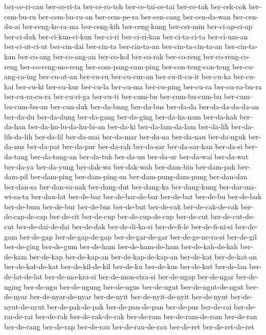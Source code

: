 {ber-ce-ri-cau ber-ce-ri-ta ber-ce-ro-teh ber-ce-tai-ce-tai ber-ce-tak
ber-cek-cok ber-cem-bu-ru ber-cem-bu-ru-an ber-cem-pe-ra ber-cen-cang
ber-cen-da-wan ber-cen-du-ai ber-ceng-ke-ra-ma ber-ceng-kih ber-ceng-kung
ber-cer-min ber-ci-ap-ci-ap ber-ci-duk ber-ci-kun-ci-kun ber-ci-ri
ber-ci-ri-kan ber-ci-ta-ci-ta ber-ci-um-an ber-ci-ut-ci-ut ber-cin-dai
ber-cin-ta ber-cin-ta-an ber-cin-ta-cin-ta-an ber-cin-ta-kan ber-co-ang
ber-co-ang-an ber-co-kol ber-co-rak ber-co-reng ber-co-reng-co-reng
ber-co-reng-mo-reng ber-com-pang-cam-ping ber-con-teng-con-teng
ber-cu-ang-ca-ing ber-cu-at-an ber-cu-cu ber-cu-cur-an ber-cu-it-cu-it
ber-cu-ka ber-cu-kai ber-cu-ki ber-cu-kur ber-cu-la ber-cu-ma ber-cu-ping
ber-cu-ra ber-cu-ra-bu-ra ber-cu-ra-cu-ra ber-cu-ri-ga ber-cu-ti
ber-cum-bu ber-cum-bu-cum-bu ber-cum-bu-cum-bu-an ber-cun-duk ber-da-bung
ber-da-bus ber-da-da ber-da-da-da-da-an ber-da-du ber-da-dung ber-da-gang
ber-da-ging ber-da-ha-nam ber-da-hak ber-da-han ber-da-hu-lu-da-hu-lu-an
ber-da-ki ber-da-lam-da-lam ber-da-lih ber-da-lih-da-lih ber-da-lil
ber-da-mai ber-da-mar ber-da-na ber-da-nau ber-da-nguk ber-da-nus
ber-da-pat ber-da-pur ber-da-rah ber-da-sar ber-da-sar-kan ber-da-si
ber-da-tang ber-da-tang-an ber-da-tuk ber-da-un ber-da-ur ber-da-wai
ber-da-wat ber-da-ya ber-da-yung ber-dak-wa ber-dak-wah ber-dam-bin
ber-dam-pak ber-dam-pil ber-dam-ping ber-dam-ping-an ber-dam-pung-dam-pung
ber-dan-dan ber-dan-sa ber-dan-sa-nak ber-dang-dut ber-dang-ka
ber-dang-kung ber-dar-ma-wi-sa-ta ber-dau-lat ber-de-bar ber-de-bar-de-bar
ber-de-bat ber-de-bu ber-de-buk ber-de-bum ber-de-bur ber-de-bus
ber-de-but ber-de-cak ber-de-cak-de-cak ber-de-cap-de-cap ber-de-cit
ber-de-cup ber-de-cup-de-cup ber-de-cut ber-de-cut-de-cut
ber-de-dai-de-dai ber-de-dak ber-de-di-ka-si ber-de-fi-le ber-de-fi-ni-si
ber-de-gam ber-de-gap ber-de-gap-de-gap ber-de-gar-de-gar
ber-de-ge-ne-ra-si ber-de-gil ber-de-ging ber-de-gum ber-de-ham
ber-de-ham-de-ham ber-de-kah-de-kah ber-de-kam ber-de-kap ber-de-kap-an
ber-de-kap-de-kap-an ber-de-kat ber-de-kat-an ber-de-kat-de-kat
ber-de-kil-de-kil ber-de-ku ber-de-kus ber-de-kut ber-de-lan
ber-de-lat-de-lat ber-de-mo-kra-si ber-de-mon-stra-si ber-de-ngap
ber-de-ngar ber-de-nging ber-de-ngu ber-de-ngung ber-de-ngus ber-de-ngut
ber-de-ngut-de-ngut ber-de-nyar ber-de-nyar-de-nyar ber-de-nyit
ber-de-nyit-de-nyit ber-de-nyut ber-de-nyut-de-nyut ber-de-pak-de-pak
ber-de-pan-de-pan ber-de-pus ber-de-rai ber-de-rai-de-rai ber-de-rak
ber-de-rak-de-rak ber-de-ram ber-de-ram-de-ram ber-de-ran ber-de-rang
ber-de-rap ber-de-rau ber-de-rau-de-rau ber-de-ret ber-de-ret-de-ret
}
